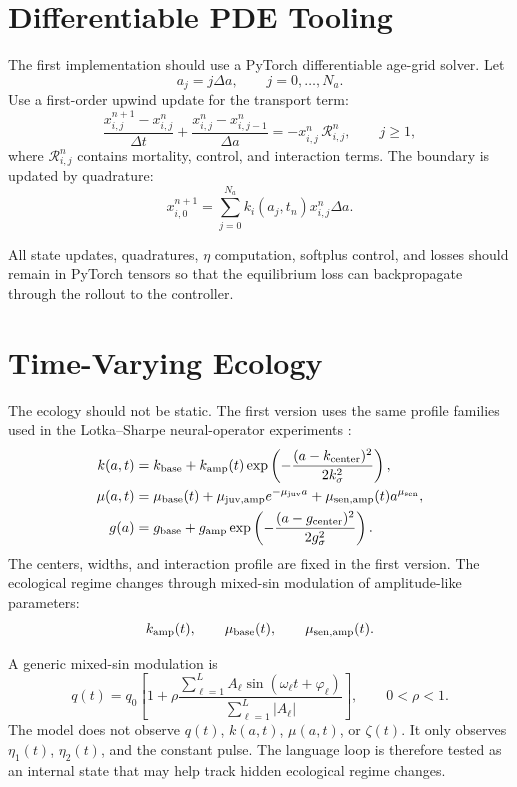 \documentclass[11pt]{article}
\begin{document}
\section{Differentiable PDE Tooling}

The first implementation should use a PyTorch differentiable age-grid
solver. Let
\[
  a_j=j\Delta a,\qquad j=0,\ldots,N_a.
\]
Use a first-order upwind update for the transport term:
\begin{equation}
  \frac{x_{i,j}^{n+1}-x_{i,j}^{n}}{\Delta t}
  +
  \frac{x_{i,j}^{n}-x_{i,j-1}^{n}}{\Delta a}
  =
  -x_{i,j}^{n}\,\mathcal R_{i,j}^{n},
  \qquad j\ge 1,
  \label{eq:upwind}
\end{equation}
where \(\mathcal R_{i,j}^{n}\) contains mortality, control, and
interaction terms. The boundary is updated by quadrature:
\begin{equation}
  x_{i,0}^{n+1}
  =
  \sum_{j=0}^{N_a}
  k_i(a_j,t_n)x_{i,j}^{n}\Delta a.
  \label{eq:boundary}
\end{equation}

All state updates, quadratures, \(\eta\) computation, softplus control,
and losses should remain in PyTorch tensors so that the equilibrium loss
can backpropagate through the rollout to the controller.

\section{Time-Varying Ecology}

The ecology should not be static. The first version uses the same profile
families used in the Lotka--Sharpe neural-operator experiments
\cite{krstic2026lotkasharpe}:
\begin{align}
  k(a,t)
  &=
  k_{\rm base}
  +
  k_{\rm amp}(t)
  \exp\left(
    -\frac{(a-k_{\rm center})^2}{2k_\sigma^2}
  \right),
  \\
  \mu(a,t)
  &=
  \mu_{\rm base}(t)
  +
  \mu_{\rm juv,amp}e^{-\mu_{\rm juv}a}
  +
  \mu_{\rm sen,amp}(t)a^{\mu_{\rm sen}},
  \\
  g(a)
  &=
  g_{\rm base}
  +
  g_{\rm amp}
  \exp\left(
    -\frac{(a-g_{\rm center})^2}{2g_\sigma^2}
  \right).
\end{align}
The centers, widths, and interaction profile are fixed in the first
version. The ecological regime changes through mixed-sin modulation of
amplitude-like parameters:
\[
  k_{\rm amp}(t),\qquad
  \mu_{\rm base}(t),\qquad
  \mu_{\rm sen,amp}(t).
\]

A generic mixed-sin modulation is
\begin{equation}
  q(t)
  =
  q_0
  \left[
    1+
    \rho
    \frac{\sum_{\ell=1}^{L} A_\ell\sin(\omega_\ell t+\varphi_\ell)}
         {\sum_{\ell=1}^{L}|A_\ell|}
  \right],
  \qquad 0<\rho<1.
  \label{eq:mixed-sin}
\end{equation}
The model does not observe \(q(t)\), \(k(a,t)\), \(\mu(a,t)\), or
\(\zeta(t)\). It only observes \(\eta_1(t)\), \(\eta_2(t)\), and the
constant pulse. The language loop is therefore tested as an internal
state that may help track hidden ecological regime changes.
\end{document}
